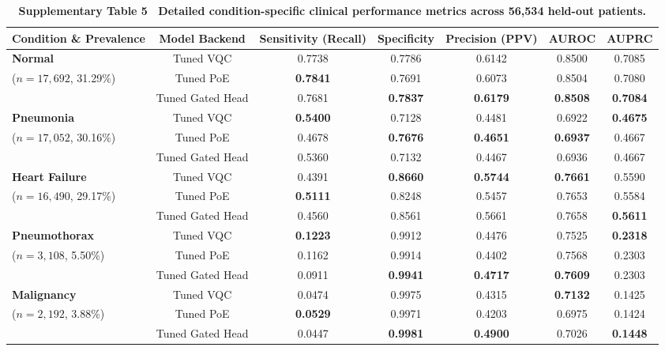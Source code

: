 \documentclass[10pt,a4paper]{article}
\begin{document}
\begin{table}[h]
\centering
\small
\caption*{\textbf{\textsf{Supplementary Table 5 \textbar\ Detailed condition-specific clinical performance metrics across 56,534 held-out patients.}}}
\begin{tabular}{lcccccc}
\toprule
\textbf{Condition \& Prevalence} & \textbf{Model Backend} & \textbf{Sensitivity (Recall)} & \textbf{Specificity} & \textbf{Precision (PPV)} & \textbf{AUROC} & \textbf{AUPRC} \\
\midrule
\textbf{Normal} & Tuned VQC & 0.7738 & 0.7786 & 0.6142 & 0.8500 & 0.7085 \\
($n = 17,692$, 31.29\%) & Tuned PoE & \textbf{0.7841} & 0.7691 & 0.6073 & 0.8504 & 0.7080 \\
& Tuned Gated Head & 0.7681 & \textbf{0.7837} & \textbf{0.6179} & \textbf{0.8508} & \textbf{0.7084} \\
\addlinespace
\textbf{Pneumonia} & Tuned VQC & \textbf{0.5400} & 0.7128 & 0.4481 & 0.6922 & \textbf{0.4675} \\
($n = 17,052$, 30.16\%) & Tuned PoE & 0.4678 & \textbf{0.7676} & \textbf{0.4651} & \textbf{0.6937} & 0.4667 \\
& Tuned Gated Head & 0.5360 & 0.7132 & 0.4467 & 0.6936 & 0.4667 \\
\addlinespace
\textbf{Heart Failure} & Tuned VQC & 0.4391 & \textbf{0.8660} & \textbf{0.5744} & \textbf{0.7661} & 0.5590 \\
($n = 16,490$, 29.17\%) & Tuned PoE & \textbf{0.5111} & 0.8248 & 0.5457 & 0.7653 & 0.5584 \\
& Tuned Gated Head & 0.4560 & 0.8561 & 0.5661 & 0.7658 & \textbf{0.5611} \\
\addlinespace
\textbf{Pneumothorax} & Tuned VQC & \textbf{0.1223} & 0.9912 & 0.4476 & 0.7525 & \textbf{0.2318} \\
($n = 3,108$, 5.50\%) & Tuned PoE & 0.1162 & 0.9914 & 0.4402 & 0.7568 & 0.2303 \\
& Tuned Gated Head & 0.0911 & \textbf{0.9941} & \textbf{0.4717} & \textbf{0.7609} & 0.2303 \\
\addlinespace
\textbf{Malignancy} & Tuned VQC & 0.0474 & 0.9975 & 0.4315 & \textbf{0.7132} & 0.1425 \\
($n = 2,192$, 3.88\%) & Tuned PoE & \textbf{0.0529} & 0.9971 & 0.4203 & 0.6975 & 0.1424 \\
& Tuned Gated Head & 0.0447 & \textbf{0.9981} & \textbf{0.4900} & 0.7026 & \textbf{0.1448} \\
\bottomrule
\end{tabular}
\end{table}
\end{document}
